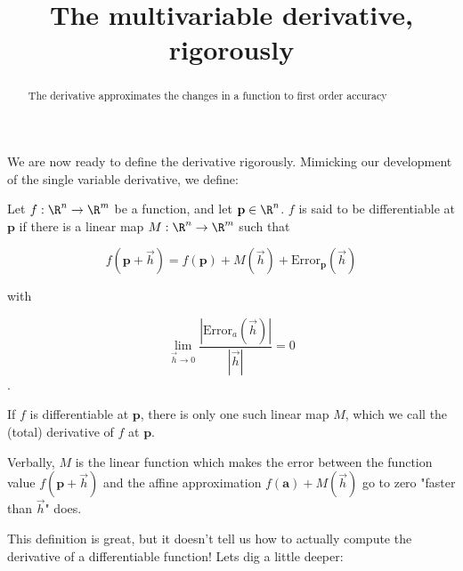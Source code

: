 \documentclass{ximera}
\title{The multivariable derivative, rigorously}
\begin{document}
	\begin{abstract}
		The derivative approximates the changes in a function to first order accuracy
	\end{abstract}
	
	We are now ready to define the derivative rigorously.  Mimicking our development of the single variable derivative, we define:

\begin{definition}
	Let $f :\R^n \to \R^m$ be a function, and let $\mathbf{p} \in \R^n$.  
	 $f$ is said to be differentiable at $\mathbf{p}$ if there is a linear map $M:\R^n \to \R^m$ such that 
		
		\[ f(\mathbf{p}+\vec{h}) = f(\mathbf{p}) + M(\vec{h})+ \text{Error}_{\mathbf{p}}(\vec{h})\]
		
		with
		
		\[ \lim_{\vec{h} \to 0} \frac{\left|\text{Error}_a(\vec{h})\right|}{\left|\vec{h}\right|} = 0 \].
		
		If $f$ is differentiable at $\mathbf{p}$, there is only one such linear map $M$, which we call the (total) derivative of $f$ at $\mathbf{p}$.  
		
		Verbally,  $M$ is the linear function which makes the error between the function value $f(\mathbf{p}+\vec{h})$ and the affine approximation 
		$f(\mathbf{a})+M(\vec{h})$ go to zero "faster than $\vec{h}$" does.
\end{definition}

This definition is great, but it doesn't tell us how to actually compute the derivative of a differentiable function!  Lets dig a little deeper:
\end{document}

